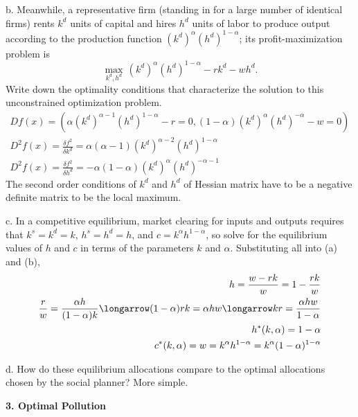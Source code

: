 \documentclass[12pt]{article}
\begin{document}
\begin{description}
\item b. Meanwhile, a representative firm (standing in for a large number of identical firms) rents $k^{d}$ units of capital and hires $h^{d}$ units of labor to produce output according to the production function $(k^{d})^{\alpha}(h^{d})^{1-\alpha}$; its profit-maximization problem is
$$
\max_{k^{d},h^{d}} \, (k^{d})^{\alpha}(h^{d})^{1-\alpha} - rk^{d} - wh^{d}.
$$
Write down the optimality conditions that characterize the solution to this unconstrained optimization problem. 
\begin{align*} 
Df(x) = (\alpha(k^d)^{\alpha-1}(h^d)^{1-\alpha} - r = 0, (1-\alpha)(k^d)^{\alpha}(h^d)^{-\alpha} - w = 0)   \\ 
D^2f(x) = \frac{\delta f^2}{\delta k^d} = \alpha(\alpha-1)(k^d)^{\alpha-2}(h^d)^{1-\alpha}    \\ 
D^2f(x) = \frac{\delta f^2}{\delta h^d} = -\alpha(1-\alpha)(k^d)^{\alpha}(h^d)^{-\alpha-1} 
\end{align*}
The second order conditions of $k^d$ and $h^d$ of Hessian matrix have to be a negative definite matrix to be the local maximum. 

\item c. In a competitive equilibrium, market clearing for inputs and outputs requires that $k^{s}=k^{d}=k$, $h^{s}=h^{d}=h$, and $c=k^{\alpha}h^{1-\alpha}$, so solve for the equilibrium values of $h$ and $c$ in terms of the parameters $k$ and $\alpha$.
Substituting all into (a) and (b), 
\begin{align*}
h = \frac{w - rk}{w} = 1-\frac{rk}{w}   \\ 
\frac{r}{w} = \frac{\alpha h}{(1-\alpha)k}  \longarrow  (1-\alpha)rk = \alpha hw  \longarrow kr = \frac{\alpha hw}{1-\alpha}    \\ 
h^*(k, \alpha) = 1-\alpha   \\ 
c^*(k, \alpha) = w = k^{\alpha}h^{1-\alpha} = k^{\alpha}(1-\alpha)^{1-\alpha} 
\end{align*}

\item d. How do these equilibrium allocations compare to the optimal allocations chosen by the social planner?
More simple. 
\end{description}

{\bfseries 3. Optimal Pollution}
\end{document}
